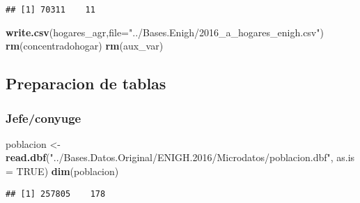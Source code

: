 \documentclass[11pt,]{article}
\newenvironment{Shaded}{\begin{snugshade}}{\end{snugshade}}
\newcommand{\KeywordTok}[1]{\textcolor[rgb]{0.13,0.29,0.53}{\textbf{#1}}}
\newcommand{\DataTypeTok}[1]{\textcolor[rgb]{0.13,0.29,0.53}{#1}}
\newcommand{\DecValTok}[1]{\textcolor[rgb]{0.00,0.00,0.81}{#1}}
\newcommand{\StringTok}[1]{\textcolor[rgb]{0.31,0.60,0.02}{#1}}
\newcommand{\CommentTok}[1]{\textcolor[rgb]{0.56,0.35,0.01}{\textit{#1}}}
\newcommand{\OtherTok}[1]{\textcolor[rgb]{0.56,0.35,0.01}{#1}}
\newcommand{\OperatorTok}[1]{\textcolor[rgb]{0.81,0.36,0.00}{\textbf{#1}}}
\newcommand{\NormalTok}[1]{#1}
\begin{document}
\begin{verbatim}
## [1] 70311    11
\end{verbatim}

\begin{Shaded}
\begin{Highlighting}[]
\KeywordTok{write.csv}\NormalTok{(hogares_agr,}\DataTypeTok{file=}\StringTok{"../Bases.Enigh/2016_a_hogares_enigh.csv"}\NormalTok{)}
\KeywordTok{rm}\NormalTok{(concentradohogar)}
\KeywordTok{rm}\NormalTok{(aux_var)}
\end{Highlighting}
\end{Shaded}

\subsection{Preparacion de tablas}\label{preparacion-de-tablas}

\subsubsection{Jefe/conyuge}\label{jefeconyuge}

\begin{Shaded}
\begin{Highlighting}[]
\NormalTok{poblacion <-}\StringTok{ }\KeywordTok{read.dbf}\NormalTok{(}\StringTok{"../Bases.Datos.Original/ENIGH.2016/Microdatos/poblacion.dbf"}\NormalTok{, }
                       \DataTypeTok{as.is =} \OtherTok{TRUE}\NormalTok{)}
\KeywordTok{dim}\NormalTok{(poblacion)}
\end{Highlighting}
\end{Shaded}

\begin{verbatim}
## [1] 257805    178
\end{verbatim}

\begin{Shaded}
\end{Shaded}
\end{document}
